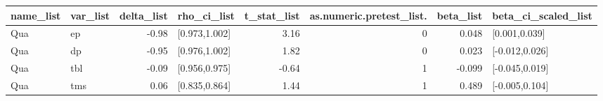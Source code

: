 \begin{table}[ht]
\centering
\begin{tabular}{llrlrrrl}
  \hline
name\_list & var\_list & delta\_list & rho\_ci\_list & t\_stat\_list & as.numeric.pretest\_list. & beta\_list & beta\_ci\_scaled\_list \\ 
  \hline
Qua & ep & -0.98 & [0.973,1.002] & 3.16 & 0 & 0.048 & [0.001,0.039] \\ 
  Qua & dp & -0.95 & [0.976,1.002] & 1.82 & 0 & 0.023 & [-0.012,0.026] \\ 
  Qua & tbl & -0.09 & [0.956,0.975] & -0.64 & 1 & -0.099 & [-0.045,0.019] \\ 
  Qua & tms & 0.06 & [0.835,0.864] & 1.44 & 1 & 0.489 & [-0.005,0.104] \\ 
   \hline
\end{tabular}
\end{table}
